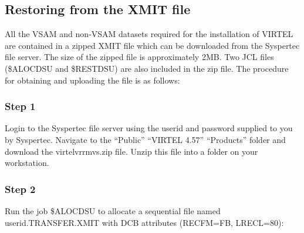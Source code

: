 \documentclass[letterpaper,10pt,english]{sphinxmanual}
\begin{document}

\subsection{Restoring from the XMIT file}
\label{\detokenize{Installation_Guide:index-4}}\label{\detokenize{Installation_Guide:restoring-from-the-xmit-file}}
All the VSAM and non-VSAM datasets required for the installation of VIRTEL are contained in a zipped XMIT file which can be downloaded from the Syspertec file server. The size of the zipped file is approximately 2MB. Two JCL files (\$ALOCDSU and \$RESTDSU) are also     included in the zip file. The procedure for obtaining and uploading the file is as follows:


\subsubsection{Step 1}
\label{\detokenize{Installation_Guide:step-1}}
Login to the Syspertec file server  using the userid and password supplied to you by Syspertec. Navigate to the “Public” \textendash{} “VIRTEL 4.57” \textendash{} “Products” folder and download the virtelvrrmvs.zip file. Unzip this file into a folder on your workstation.

\newpage


\subsubsection{Step 2}
\label{\detokenize{Installation_Guide:step-2}}
Run the job \$ALOCDSU to allocate a sequential file named userid.TRANSFER.XMIT with DCB attributes (RECFM=FB, LRECL=80):
\end{document}
